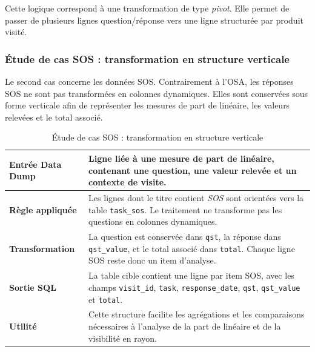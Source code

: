 Cette logique correspond à une transformation de type \textit{pivot}. Elle permet de passer de plusieurs lignes question/réponse vers une ligne structurée par produit visité.

\subsubsection{Étude de cas SOS : transformation en structure verticale}

Le second cas concerne les données SOS. Contrairement à l’OSA, les réponses SOS ne sont pas transformées en colonnes dynamiques. Elles sont conservées sous forme verticale afin de représenter les mesures de part de linéaire, les valeurs relevées et le total associé.

\begin{table}[H]
\centering

\begin{tcolorbox}[technicalbox,breakable=false,title={Étude de cas SOS --- Structure verticale},halign title=center]
\small
\renewcommand{\arraystretch}{1.35}
\begin{tabular}{p{}|p{}}

\textbf{Entrée Data Dump} &
Ligne liée à une mesure de part de linéaire, contenant une question, une valeur relevée et un contexte de visite. \\
\hline

\textbf{Règle appliquée} &
Les lignes dont le titre contient \textit{SOS} sont orientées vers la table \texttt{task\_sos}. Le traitement ne transforme pas les questions en colonnes dynamiques. \\
\hline

\textbf{Transformation} &
La question est conservée dans \texttt{qst}, la réponse dans \texttt{qst\_value}, et le total associé dans \texttt{total}. Chaque ligne SOS reste donc un item d’analyse. \\
\hline

\textbf{Sortie SQL} &
La table cible contient une ligne par item SOS, avec les champs \texttt{visit\_id}, \texttt{task}, \texttt{response\_date}, \texttt{qst}, \texttt{qst\_value} et \texttt{total}. \\
\hline

\textbf{Utilité} &
Cette structure facilite les agrégations et les comparaisons nécessaires à l’analyse de la part de linéaire et de la visibilité en rayon.

\end{tabular}
\end{tcolorbox}

\caption{Étude de cas SOS : transformation en structure verticale}
\label{tab:sos_transformation}
\end{table}

